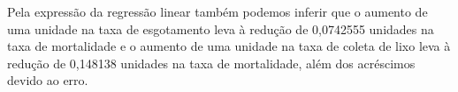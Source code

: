 Pela expressão da regressão linear também podemos inferir que o aumento de uma unidade na taxa de esgotamento leva à redução de 0,0742555 unidades na taxa de mortalidade e o aumento
de uma unidade na taxa de coleta de lixo leva à redução de 0,148138 unidades na taxa de mortalidade, além dos acréscimos devido ao erro.
